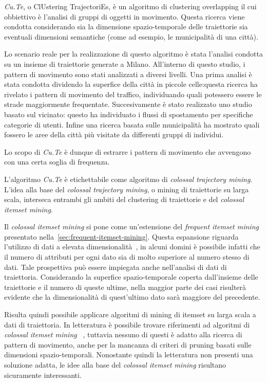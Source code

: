 \textit{Cu.Te}, o ClUstering TrajectoriEs, è un algoritmo di clustering overlapping il cui obbiettivo è l'analisi
di gruppi di oggetti in movimento. Questa ricerca viene condotta considerando sia la dimensione spazio-temporale
delle traiettorie sia eventuali dimensioni semantiche (come ad esempio, le municipalità di una città).

Lo scenario reale per la realizzazione di questo algoritmo è stata l'analisi condotta su
un insieme di traiettorie generate a Milano. All'interno di questo studio, i pattern di movimento sono
stati analizzati a diversi livelli.
Una prima analisi è stata condotta dividendo la superfice della città in piccole celle:questa ricerca
ha rivelato i pattern di movimento del traffico, individuando quali potessero essere le strade
maggiormente frequentate.
Succesivamente è stato realizzato uno studio basato sul vicinato: questo ha individuato i flussi di spostamento per specifiche categorie di utenti.
Infine una ricerca basata sulle municipalità ha mostrato quali fossero le aree della città più visitate da differenti gruppi di individui.

Lo scopo di \textit{Cu.Te} è dunque di estrarre i pattern di movimento che avvengono con una certa soglia di frequenza.

L'algoritmo \textit{Cu.Te} è etichettabile come algoritmo di \textit{colossal trajectory mining}.
L'idea alla base del \textit{colossal trajectory mining},
o mining di traiettorie su larga scala, interseca entrambi gli ambiti del clustering di traiettorie
e del \textit{colossal itemset mining}.


Il \textit{colossal itemset mining} si pone come un'estensione del \textit{frequent itemset mining}
presentato nella~\cref{sec:frequent-itemset-mining}. Questa espansione riguarda l'utilizzo di dati
a elevata dimensionalità~\cite{zhu2007mining}, in alcuni domini è possibile infatti che il numero di attributi per ogni dato sia di molto superiore al numero stesso di dati.
Tale prospettiva può essere impiegata anche nell'analisi di dati di traiettoria. Considerando la superfice
spazio-temporale coperta dall'insieme delle traiettorie e il numero di queste ultime, nella maggior parte dei casi risulterà evidente
che la dimensionalità di quest'ultimo dato sarà maggiore del precedente.

Risulta quindi possibile applicare algoritmi di mining di itemset su larga scala a dati di traiettoria.
In letteratura è possibile trovare riferimenti ad algoritmi di \textit{colossal itemset mining}~\cite{DBLP:journals/bdr/ApilettiBCGPM17, DBLP:conf/kdd/PanCTYZ03}
, tuttavia nessuno di questi è adatto alla ricerca di pattern di movimento, anche per la mancanza di
criteri di pruning basati sulle dimensioni spazio-temporali. Nonostante quindi la letteratura non
presenti una soluzione adatta, le idee alla base del \textit{colossal itemset mining} risultano sicuramente interessanti.

